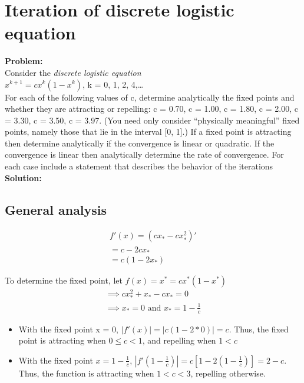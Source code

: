 \newpage

\section{Iteration of discrete logistic equation}%

\textbf{Problem:}
\\
Consider the \textit{discrete logistic equation}\\
$x^{k+1} = cx^{k} (1-x^{k})$, k = 0, 1, 2, 4,\ldots
\\
For each of the following values of c, determine analytically the fixed points and whether they are attracting or repelling: c = 0.70, c = 1.00, c = 1.80, c = 2.00, c = 3.30, c = 3.50, c = 3.97. (You need only consider “physically meaningful” fixed points, namely those that lie in the interval [0, 1].)
If a fixed point is attracting then determine analytically if the convergence is linear or quadratic.
If the convergence is linear then analytically determine the rate of convergence.
For each case include a statement that describes the behavior of the iterations
\\
\textbf{Solution:}
\subsection{General analysis}
\begin{align*}
    f'(x) = (cx_{*} - cx_{*}^{2})' \\
    = c - 2cx_{*} \\
    = c(1 - 2x_{*})
\end{align*}

To determine the fixed point, let
$f(x) = x^{*} = cx^{*}(1 - x^{*})$\\
\begin{align*}
\implies cx_{*}^{2} + x_{*} - cx_{*} = 0 \\
\implies x_{*} = 0 \text{ and } x_{*} = 1 - \frac{1}{c}
\end{align*}

\begin{itemize}
    \item With the fixed point x = 0, $|f'(x)| = |c( 1- 2*0 )| = c $. Thus, the fixed point is attracting when $0 \le c < 1$, and repelling when $1 < c$
    \item With the fixed point $x = 1 - \frac{1}{c}$,  $|f'(1- \frac{1}{c})| = c[ 1 - 2 (1 - \frac{1}{c}) ] = 2 - c$. Thus, the function is attracting when $1 < c < 3$, repelling otherwise.
\end{itemize}

